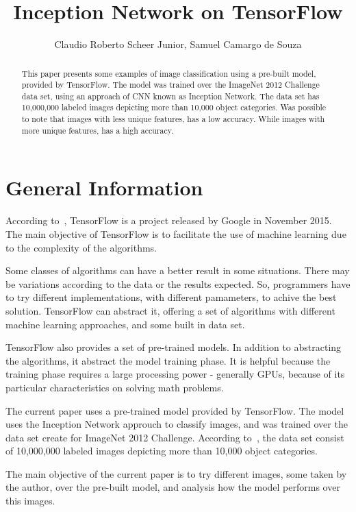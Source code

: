 \documentclass[12pt]{article}
\title{Inception Network on TensorFlow}
\author{Claudio Roberto Scheer Junior\inst{1}, Samuel Camargo de Souza\inst{1}}
\begin{document}
 

\maketitle

\begin{abstract}
  This paper presents some examples of image classification using a pre-built model, provided by TensorFlow. The model was trained over the ImageNet 2012 Challenge data set, using an approach of CNN known as Inception Network. The data set has 10,000,000 labeled images depicting more than 10,000 object categories. Was possible to note that images with less unique features, has a low accuracy. While images with more unique features, has a high accuracy.
\end{abstract}

\section{General Information}

According to~\cite{tensorflow2015-whitepaper}, TensorFlow is a project released by Google in November 2015. The main objective of TensorFlow is to facilitate the use of machine learning due to the complexity of the algorithms.

Some classes of algorithms can have a better result in some situations. There may be variations according to the data or the results expected. So, programmers have to try different implementations, with different pamameters, to achive the best solution. TensorFlow can abstract it, offering a set of algorithms with different machine learning approaches, and some built in data set.

TensorFlow also provides a set of pre-trained models. In addition to abstracting the algorithms, it abstract the model training phase. It is helpful because the training phase requires a large processing power - generally GPUs, because of its particular characteristics on solving math problems.

The current paper uses a pre-trained model provided by TensorFlow. The model uses the Inception Network approuch to classify images, and was trained over the data set create for ImageNet 2012 Challenge. According to~\cite{imagenet}, the data set consist of 10,000,000 labeled images depicting more than 10,000 object categories.

The main objective of the current paper is to try different images, some taken by the author, over the pre-built model, and analysis how the model performs over this images.
\end{document}

